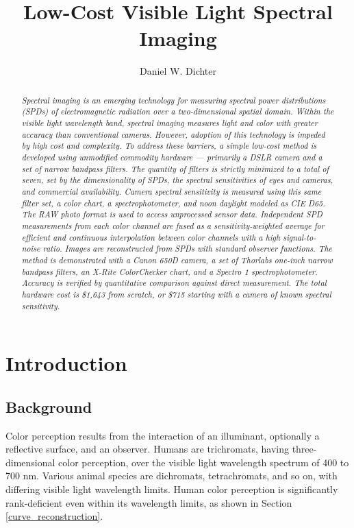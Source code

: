 \documentclass[twocolumn,10pt]{asme2ej}
\title{Low-Cost Visible Light Spectral Imaging}
\author{Daniel W. Dichter
    \affiliation{
Independent Researcher\\
Cambridge, Massachusetts, U.S.A.\\
daniel.w.dichter@gmail.com\\
\\
\color{red}
\emph{\textbf{DRAFT: \today}}\\
\color{black}

    }	
}
\begin{document}
\maketitle

\pagestyle{fancy}

\begin{abstract}{\it Spectral imaging is an emerging technology for measuring spectral power distributions (SPDs) of electromagnetic radiation over a two-dimensional spatial domain. Within the visible light wavelength band, spectral imaging measures light and color with greater accuracy than conventional cameras. However, adoption of this technology is impeded by high cost and complexity. To address these barriers, a simple low-cost method is developed using unmodified commodity hardware --- primarily a DSLR camera and a set of narrow bandpass filters. The quantity of filters is strictly minimized to a total of seven, set by the dimensionality of SPDs, the spectral sensitivities of eyes and cameras, and commercial availability. Camera spectral sensitivity is measured using this same filter set, a color chart, a spectrophotometer, and noon daylight modeled as CIE D65. The RAW photo format is used to access unprocessed sensor data. Independent SPD measurements from each color channel are fused as a sensitivity-weighted average for efficient and continuous interpolation between color channels with a high signal-to-noise ratio. Images are reconstructed from SPDs with standard observer functions. The method is demonstrated with a Canon 650D camera, a set of Thorlabs one-inch narrow bandpass filters, an X-Rite ColorChecker chart, and a Spectro 1 spectrophotometer. Accuracy is verified by quantitative comparison against direct measurement. The total hardware cost is \$1,643 from scratch, or \$715 starting with a camera of known spectral sensitivity.
}
\end{abstract}

\section{Introduction}

\subsection{Background}


Color perception results from the interaction of an illuminant, optionally a reflective surface, and an observer. Humans are trichromats, having three-dimensional color perception, over the visible light wavelength spectrum of 400 to 700 nm. Various animal species are dichromats, tetrachromats, and so on, with differing visible light wavelength limits. Human color perception is significantly rank-deficient even within its wavelength limits, as shown in Section \ref{curve_reconstruction}.
\end{document}
